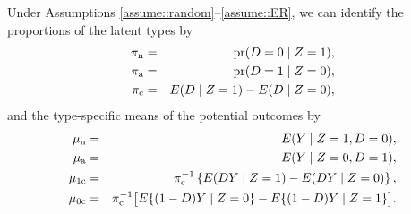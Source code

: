 \begin{theorem}
\label{thm::cace-mixture-components}
Under Assumptions \ref{assume::random}--\ref{assume::ER}, we can identify the proportions of the latent types by
\begin{eqnarray*}
 \pi_{\textup{n}} &=& \textup{pr}(D=0\mid Z=1)  ,\\
  \pi_{\textup{a}} &=&\textup{pr}(D=1\mid Z=0) , \\
  \pi_{\textup{c}} &=& E(D\mid Z=1) - E(D\mid Z=0) ,
\end{eqnarray*}
and the type-specific means of the potential outcomes by
\begin{eqnarray*}
  \mu_{\textup{n}} &=& E(Y\mid Z=1, D=0) ,\\
 \mu_{\textup{a}} &=& E(Y\mid Z=0, D=1),\\
 \mu_{1\textup{c}} &=& \pi_{\textup{c}}^{-1}\left\{   E(DY\mid Z=1 )  -  E(DY\mid Z=0)    \right\}, \\
  \mu_{0\textup{c}}  &=& \pi_{\textup{c}}^{-1} \big[   E\{ (1-D)Y\mid Z=0 \}  -  E\{(1-D)Y\mid Z=1 \}    \big]. 
\end{eqnarray*}
\end{theorem}
 
